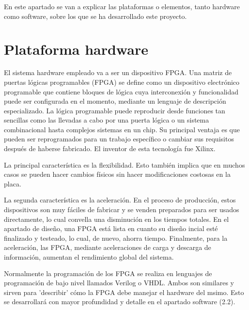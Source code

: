 En este apartado se van a explicar las plataformas o elementos, tanto hardware como 
software, sobre los que se ha desarrollado este proyecto. 
\vspace{1cm}
\label{chp:ManLaTeX}
\minitoc

\section{Plataforma hardware}
El sistema hardware empleado va a ser un dispositivo FPGA. Una matriz de puertas lógicas 
programables (FPGA) se define como un dispositivo electrónico programable que contiene 
bloques de lógica cuya interconexión y funcionalidad puede ser configurada en el momento, 
mediante un lenguaje de descripción especializado. La lógica programable puede reproducir 
desde funciones tan sencillas como las llevadas a cabo por una puerta lógica o un sistema 
combinacional hasta complejos sistemas en un chip. Su principal 
ventaja es que pueden ser reprogramados para un trabajo específico o cambiar sus 
requisitos después de haberse fabricado. El inventor de esta tecnología fue 
Xilinx. 

La principal característica es la flexibilidad. Esto también implica que en muchos
casos se pueden hacer cambios físicos sin hacer modificaciones costosas en la placa.

La segunda característica es la aceleración. En el proceso de producción, 
estos dispositivos son muy fáciles de fabricar y se venden preparados para ser usados 
directamente, lo cual convella una disminución en los tiempos totales. 
En el apartado de diseño, una FPGA está lista en cuanto su diseño incial esté finalizado
y testeado, lo cual, de nuevo, ahorra tiempo. Finalmente, para la aceleración, las FPGA, 
mediante aceleraciones de carga y descarga de información, aumentan el 
rendimiento global del sistema. 

Normalmente la programación de los FPGA se realiza en lenguajes de programación de 
bajo nivel llamados Verilog o VHDL. Ambos son similares y sirven para 'describir' cómo
la FPGA debe manejar el hardware del msimo. Esto se desarrollará con mayor profundidad
y detalle en el apartado software (2.2).

